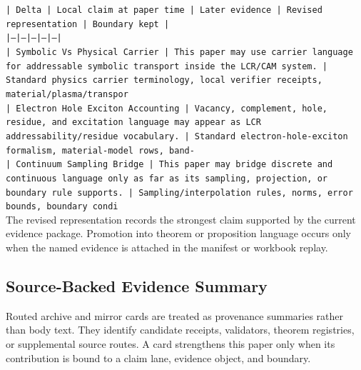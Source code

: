 \documentclass[11pt]{article}
\begin{document}
\noindent\texttt{| Delta | Local claim at paper time | Later evidence | Revised representation | Boundary kept |}\\
\noindent\texttt{|---|---|---|---|---|}\\
\noindent\texttt{| Symbolic Vs Physical Carrier | This paper may use carrier language for addressable symbolic transport inside the LCR/CAM system. | Standard physics carrier terminology, local verifier receipts, material/plasma/transpor}\\
\noindent\texttt{| Electron Hole Exciton Accounting | Vacancy, complement, hole, residue, and excitation language may appear as LCR addressability/residue vocabulary. | Standard electron-hole-exciton formalism, material-model rows, band-}\\
\noindent\texttt{| Continuum Sampling Bridge | This paper may bridge discrete and continuous language only as far as its sampling, projection, or boundary rule supports. | Sampling/interpolation rules, norms, error bounds, boundary condi}\\

The revised representation records the strongest claim supported by the current evidence package. Promotion into theorem or proposition language occurs only when the named evidence is attached in the manifest or workbook replay.

\subsection*{Source-Backed Evidence Summary}

Routed archive and mirror cards are treated as provenance summaries rather than
body text. They identify candidate receipts, validators, theorem registries, or
supplemental source routes. A card strengthens this paper only when its
contribution is bound to a claim lane, evidence object, and boundary.
\end{document}
